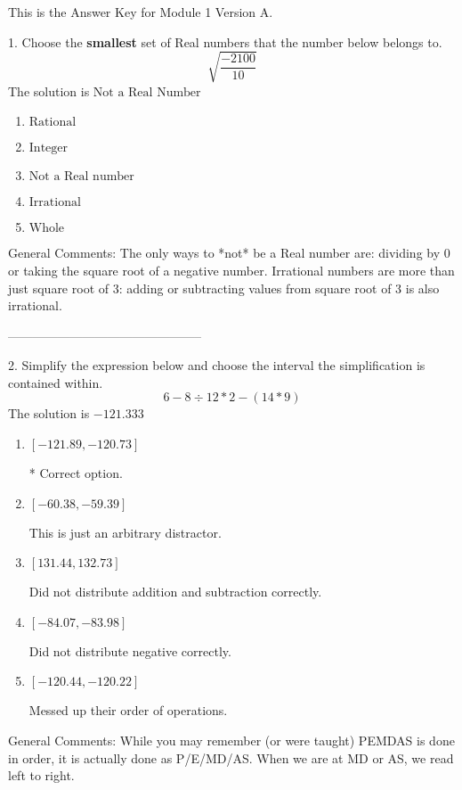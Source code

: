 \documentclass{article}[10pt]
\begin{document}
This is the Answer Key for Module 1 Version A.

1. Choose the \textbf{smallest} set of Real numbers that the number below belongs to.
$$ \sqrt{\frac{-2100}{10}} $$ 
The solution is $ \text{Not a Real Number} $ 

\begin{enumerate}[label=\Alph*.] 
\item $ \text{Rational} $ 

  
\item $ \text{Integer} $ 

  
\item $ \text{Not a Real number} $ 

  
\item $ \text{Irrational} $ 

  
\item $ \text{Whole} $ 

  
\end{enumerate} 
 
General Comments: The only ways to *not* be a Real number are: dividing by 0 or taking the square root of a negative number. Irrational numbers are more than just square root of 3: adding or subtracting values from square root of 3 is also irrational.

-----------------------------------------------

2. Simplify the expression below and choose the interval the simplification is contained within.
$$ 6 - 8 \div 12 * 2 - (14 * 9) $$ 
The solution is $ -121.333 $ 

\begin{enumerate}[label=\Alph*.] 
\item $ [-121.89, -120.73] $ 

 * Correct option. 
\item $ [-60.38, -59.39] $ 

  This is just an arbitrary distractor. 
\item $ [131.44, 132.73] $ 

  Did not distribute addition and subtraction correctly. 
\item $ [-84.07, -83.98] $ 

  Did not distribute negative correctly. 
\item $ [-120.44, -120.22] $ 

  Messed up their order of operations. 
\end{enumerate} 
 
General Comments: While you may remember (or were taught) PEMDAS is done in order, it is actually done as P/E/MD/AS. When we are at MD or AS, we read left to right.
\end{document}
